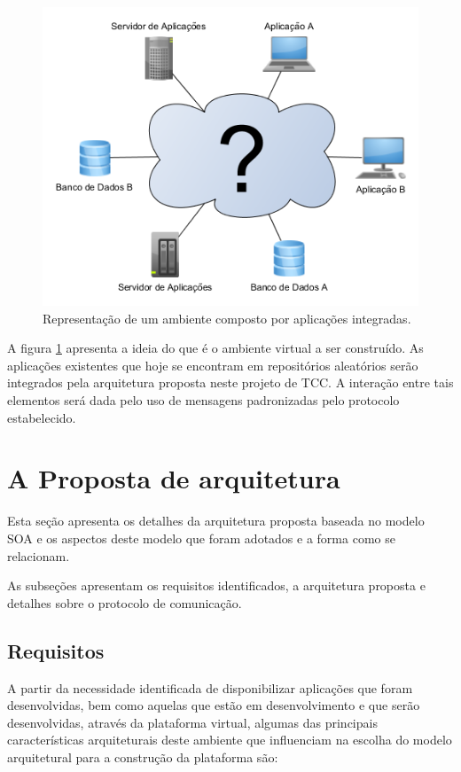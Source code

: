 \begin{figure}[!hbt]
\centering
\includegraphics[scale=0.7]{figuras/ambiente_virtual.png}
\caption{Representação de um ambiente composto por aplicações integradas.}
\label{ambiente_virtual}
\end{figure}

A figura \ref{ambiente_virtual} apresenta a ideia do que é o ambiente virtual a ser construído. As aplicações existentes que hoje se encontram em repositórios aleatórios serão integrados pela arquitetura proposta neste projeto de TCC. A interação entre tais elementos será dada pelo uso de mensagens padronizadas pelo protocolo estabelecido.

\section{A Proposta de arquitetura}

Esta seção apresenta os detalhes da arquitetura proposta baseada no modelo SOA e os aspectos deste modelo que foram adotados e a forma como se relacionam.

As subseções apresentam os requisitos identificados, a arquitetura proposta e detalhes sobre o protocolo de comunicação.

\subsection{Requisitos}
A partir da necessidade identificada de disponibilizar aplicações que foram desenvolvidas, bem como aquelas que estão em desenvolvimento e que serão desenvolvidas, através da plataforma virtual, algumas das principais características arquiteturais deste ambiente que influenciam na escolha do modelo arquitetural para a construção da plataforma são:

